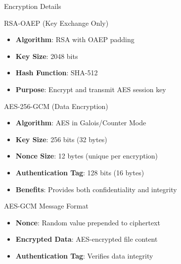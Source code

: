 \documentclass[aspectratio=169]{beamer}
\begin{document}
\begin{frame}{Encryption Details}
\begin{block}{RSA-OAEP (Key Exchange Only)}
\begin{itemize}
    \item \textbf{Algorithm}: RSA with OAEP padding
    \item \textbf{Key Size}: 2048 bits
    \item \textbf{Hash Function}: SHA-512
    \item \textbf{Purpose}: Encrypt and transmit AES session key
\end{itemize}
\end{block}

\vspace{0.5cm}

\begin{block}{AES-256-GCM (Data Encryption)}
\begin{itemize}
    \item \textbf{Algorithm}: AES in Galois/Counter Mode
    \item \textbf{Key Size}: 256 bits (32 bytes)
    \item \textbf{Nonce Size}: 12 bytes (unique per encryption)
    \item \textbf{Authentication Tag}: 128 bits (16 bytes)
    \item \textbf{Benefits}: Provides both confidentiality and integrity
\end{itemize}
\end{block}
\end{frame}

\begin{frame}{AES-GCM Message Format}
\begin{center}
\end{center}

\vspace{0.5cm}

\begin{itemize}
    \item \textbf{Nonce}: Random value prepended to ciphertext
    \item \textbf{Encrypted Data}: AES-encrypted file content
    \item \textbf{Authentication Tag}: Verifies data integrity
\end{itemize}
\end{frame}
\end{document}
